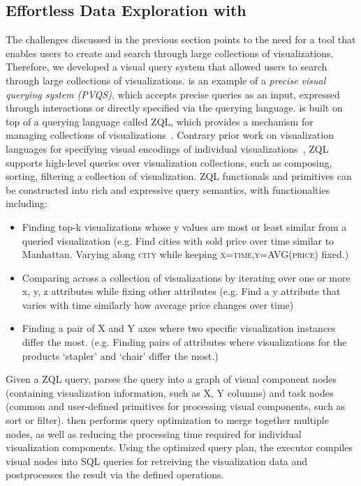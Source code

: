 \subsection{Effortless Data Exploration with \zv}
\par The challenges discussed in the previous section points to the need for a tool that enables users to create and search through large collections of visualizations. Therefore, we developed \zv a visual query system that allowed users to search through large collections of visualizations. \zv is an example of a \emph{precise visual querying system (PVQS)}, which accepts precise queries as an input, expressed through interactions or directly specified via the querying language. \zv is built on top of a querying language called ZQL, which provides a mechanism for managing collections of visualizations~\cite{Siddiqui2016}. Contrary prior work on visualization languages for specifying visual encodings of individual visualizations~\cite{Stolte2002,Wilkinson2005}, ZQL supports high-level queries over visualization collections, such as composing, sorting, filtering a collection of visualization. ZQL functionals and primitives can be constructed into rich and expressive query semantics, with functionalties including: 
\begin{itemize}
	\item Finding top-k visualizations whose y values are most or least similar from a queried visualization (e.g. Find cities with sold price over time similar to Manhattan. Varying along \textsc{city} while keeping \textsc{x=time,y=AVG(price)} fixed.) 
	\item Comparing across a collection of visualizations by iterating over one or more x, y, z attributes while fixing other attributes (e.g. Find a y attribute that varies with time similarly how average price changes over time)
	\item Finding a pair of X and Y axes where two specific visualization instances differ the most. (e.g. Finding pairs of attributes where visualizations for the products `stapler' and `chair' differ the most.)
\end{itemize}
\par Given a ZQL query, \zv parses the query into a graph of visual component nodes (containing visualization information, such as X, Y columns) and task nodes (common and user-defined primitives for processing visual components, such as sort or filter). \zv then performs query optimization to merge together multiple nodes, as well as reducing the processing time required for individual visualization components. Using the optimized query plan, the executor compiles visual nodes into SQL queries for retreiving the visualization data and postprocesses the result via the defined operations. 
